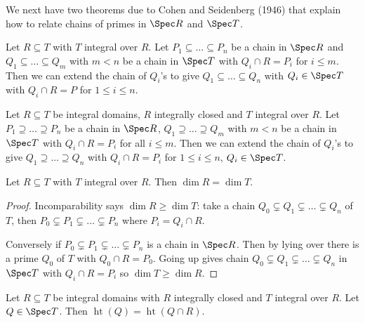 \documentclass[a4paper]{article}
\DeclareMathOperator{\htt}{ht} %
\begin{document}
We next have two theorems due to Cohen and Seidenberg (1946) that explain how to relate chains of primes in \(\Spec R\) and \(\Spec T\).

\begin{theorem}
  \label{thm:going up}
  Let \(R \subseteq T\) with \(T\) integral over \(R\). Let \(P_1 \subseteq \dots \subseteq P_n\) be a chain in \(\Spec R\) and \(Q_1 \subseteq \dots \subseteq Q_m\) with \(m < n\) be a chain in \(\Spec T\) with \(Q_i \cap R = P_i\) for \(i \leq m\). Then we can extend the chain of \(Q_i\)'s to give \(Q_1 \subseteq \dots \subseteq Q_n\) with \(Q_i \in \Spec T\) with \(Q_i \cap R = P\) for \(1 \leq i \leq n\).
\end{theorem}

\begin{theorem}
  \label{thm:going down}
  Let \(R \subseteq T\) be integral domains, \(R\) integrally closed and \(T\) integral over \(R\). Let \(P_1 \supseteq \dots \supseteq P_n\) be a chain in \(\Spec R\), \(Q_1 \supseteq \dots \supseteq Q_m\) with \(m < n\) be a chain in \(\Spec T\) with \(Q_i \cap R = P_i\) for all \(i \leq m\). Then we can extend the chain of \(Q_i\)'s to give \(Q_1 \supseteq \dots \supseteq Q_n\) with \(Q_i \cap R = P_i\) for \(1 \leq i \leq n\), \(Q_i \in \Spec T\).
\end{theorem}

\begin{corollary}
  \label{cor:dimension of integral extension}
  Let \(R \subseteq T\) with \(T\) integral over \(R\). Then \(\dim R = \dim T\).
\end{corollary}

\begin{proof}
  Incomparability says \(\dim R \geq \dim T\): take a chain \(Q_0 \subsetneq Q_1 \subsetneq \dots \subsetneq Q_n\) of \(T\), then \(P_0 \subsetneq P_1 \subsetneq \dots \subsetneq P_n\) where \(P_i = Q_i \cap R\).

  Conversely if \(P_0 \subsetneq P_1 \subsetneq \dots \subsetneq P_n\) is a chain in \(\Spec R\). Then by lying over there is a prime \(Q_0\) of \(T\) with \(Q_0 \cap R = P_0\). Going up gives chain \(Q_0 \subsetneq Q_1 \subsetneq \dots \subsetneq Q_n\) in \(\Spec T\) with \(Q_i \cap R = P_i\) so \(\dim T \geq \dim R\).
\end{proof}

\begin{corollary}
  Let \(R \subseteq T\) be integral domains with \(R\) integrally closed and \(T\) integral over \(R\). Let \(Q \in \Spec T\). Then \(\htt(Q) = \htt(Q \cap R)\).
\end{corollary}
\end{document}
